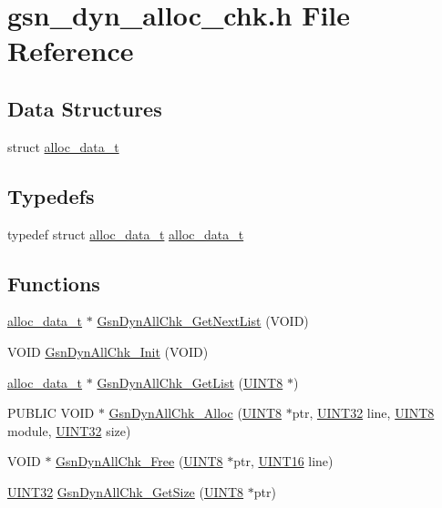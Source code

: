 \hypertarget{a00488}{
\section{gsn\_\-dyn\_\-alloc\_\-chk.h File Reference}
\label{a00488}
}
\subsection*{Data Structures}
\begin{DoxyCompactItemize}
\item 
struct \hyperlink{a00001}{alloc\_\-data\_\-t}
\end{DoxyCompactItemize}
\subsection*{Typedefs}
\begin{DoxyCompactItemize}
\item 
typedef struct \hyperlink{a00001}{alloc\_\-data\_\-t} \hyperlink{a00488_a8bb3448df50b6caaac01de9af3197b00}{alloc\_\-data\_\-t}
\end{DoxyCompactItemize}
\subsection*{Functions}
\begin{DoxyCompactItemize}
\item 
\hyperlink{a00001}{alloc\_\-data\_\-t} $\ast$ \hyperlink{a00488_a0cb5ec4504b7c1b6fc5f8031c5599b00}{GsnDynAllChk\_\-GetNextList} (VOID)
\item 
VOID \hyperlink{a00488_a675b8d69591ccf67a6642ee00b1e1649}{GsnDynAllChk\_\-Init} (VOID)
\item 
\hyperlink{a00001}{alloc\_\-data\_\-t} $\ast$ \hyperlink{a00488_a01e01f7f490e04bf158497bf6a00a348}{GsnDynAllChk\_\-GetList} (\hyperlink{a00660_gab27e9918b538ce9d8ca692479b375b6a}{UINT8} $\ast$)
\item 
PUBLIC VOID $\ast$ \hyperlink{a00488_af1e05f80dd59723d38fe117a5eb17685}{GsnDynAllChk\_\-Alloc} (\hyperlink{a00660_gab27e9918b538ce9d8ca692479b375b6a}{UINT8} $\ast$ptr, \hyperlink{a00660_gae1e6edbbc26d6fbc71a90190d0266018}{UINT32} line, \hyperlink{a00660_gab27e9918b538ce9d8ca692479b375b6a}{UINT8} module, \hyperlink{a00660_gae1e6edbbc26d6fbc71a90190d0266018}{UINT32} size)
\item 
VOID $\ast$ \hyperlink{a00488_a901d2ed926902f72e305cb710bde4bca}{GsnDynAllChk\_\-Free} (\hyperlink{a00660_gab27e9918b538ce9d8ca692479b375b6a}{UINT8} $\ast$ptr, \hyperlink{a00660_ga09f1a1fb2293e33483cc8d44aefb1eb1}{UINT16} line)
\item 
\hyperlink{a00660_gae1e6edbbc26d6fbc71a90190d0266018}{UINT32} \hyperlink{a00488_a772312a2c9fd8dd929854e1c3667bd66}{GsnDynAllChk\_\-GetSize} (\hyperlink{a00660_gab27e9918b538ce9d8ca692479b375b6a}{UINT8} $\ast$ptr)
\end{DoxyCompactItemize}


